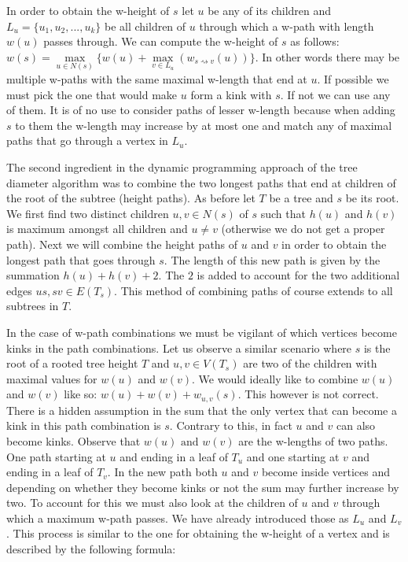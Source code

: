 In order to obtain the w-height of $s$ let $u$ be any of its children and $L_u = \{u_1, u_2, ..., u_k\}$ be all children of $u$ through which a w-path with length $w(u)$ passes through. We can compute the w-height of $s$ as follows: $w(s) = \max\limits_{u \in N(s)}\{ w(u) + \max\limits_{v \in L_u}(w_{s \rightsquigarrow v}(u)) \}$. In other words there may be multiple w-paths with the same maximal w-length that end at $u$. If possible we must pick the one that would make $u$ form a kink with $s$. If not we can use any of them. It is of no use to consider paths of lesser w-length because when adding $s$ to them the w-length may increase by at most one and match any of maximal paths that go through a vertex in $L_u$.

The second ingredient in the dynamic programming approach of the tree diameter algorithm was to combine the two longest paths that end at children of the root of the subtree (height paths). As before let $T$ be a tree and $s$ be its root. We first find two distinct children $u, v \in N(s)$ of $s$ such that $h(u)$ and $h(v)$ is maximum amongst all children and $u \ne v$ (otherwise we do not get a proper path). Next we will combine the height paths of $u$ and $v$ in order to obtain the longest path that goes through $s$. The length of this new path is given by the summation $h(u) + h(v) + 2$. The $2$ is added to account for the two additional edges $us, sv \in E(T_s)$. This method of combining paths of course extends to all subtrees in $T$.

In the case of w-path combinations we must be vigilant of which vertices become kinks in the path combinations. Let us observe a similar scenario where $s$ is the root of a rooted tree height $T$ and $u, v \in V(T_s)$ are two of the children with maximal values for $w(u)$ and $w(v)$. We would ideally like to combine $w(u)$ and $w(v)$ like so: $w(u) + w(v) + w_{u, v}(s)$. This however is not correct. There is a hidden assumption in the sum that the only vertex that can become a kink in this path combination is $s$. Contrary to this, in fact $u$ and $v$ can also become kinks. Observe that $w(u) \text{ and } w(v)$ are the w-lengths of two paths. One path starting at $u$ and ending in a leaf of $T_u$ and one starting at $v$ and ending in a leaf of $T_v$. In the new path both $u$ and $v$ become inside vertices and depending on whether they become kinks or not the sum may further increase by two. To account for this we must also look at the children of $u$ and $v$ through which a maximum w-path passes. We have already introduced those as $L_u$ and $L_v$. This process is similar to the one for obtaining the w-height of a vertex and is described by the following formula:


